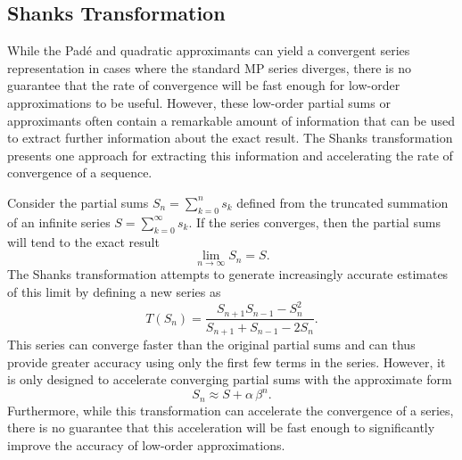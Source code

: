 \documentclass[aps,prb,reprint,noshowkeys,superscriptaddress]{revtex4-1}
\begin{document}
\subsection{Shanks Transformation}
\label{sec:Shanks}

While the Pad\'e and quadratic approximants can yield a convergent series representation
in cases where the standard MP series diverges, there is no guarantee that the rate of convergence
will be fast enough for low-order approximations to be useful.
However, these low-order partial sums or approximants often contain a remarkable amount of information
that can be used to extract further information about the exact result.
The Shanks transformation presents one approach for extracting this information
and accelerating the rate of convergence of a sequence.\cite{Shanks_1955,BenderBook}

Consider the partial sums
$S_n = \sum_{k=0}^{n} s_k$
defined from the truncated summation of an infinite series 
$S = \sum_{k=0}^{\infty} s_k$.
If the series converges, then the partial sums will tend to the exact result 
\begin{equation}
	\lim_{n \to \infty} S_n = S. 
\end{equation}
The Shanks transformation attempts to generate increasingly accurate estimates of this
limit by defining a new series as
\begin{equation}
    T(S_n) = \frac{S_{n+1} S_{n-1} - S_{n}^2}{S_{n+1} + S_{n-1} - 2 S_{n}}.
\end{equation}
This series can converge faster than the original partial sums and can thus provide greater
accuracy using only the first few terms in the series.
However, it is only designed to accelerate converging partial sums with 
the approximate form
\begin{equation}
    S_n \approx S + \alpha\,\beta^n.
\end{equation}
Furthermore, while this transformation can accelerate the convergence of a series, 
there is no guarantee that this acceleration will be fast enough to significantly
improve the accuracy of low-order approximations.
\end{document}
